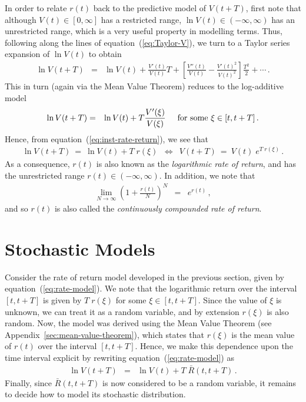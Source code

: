 \documentclass[a4paper]{book}
\begin{document}
In order to relate $r(t)$ back to the predictive model of $V(t+T)$,
first note that although $V(t)\in[0,\infty]$ has a restricted range,
$\ln V(t)\in(-\infty,\infty)$ has an unrestricted range, which is
a very useful property in modelling terms.
Thus, following along the lines of equation~(\ref{eq:Taylor-V}),
we turn to a Taylor series expansion
of $\ln V(t)$ to obtain
\begin{eqnarray}
\ln V(t+T) & = & \ln V(t)+\frac{V'(t)}{V(t)}T
+\left[\frac{V''(t)}{V(t)}
-\frac{V'(t)^2}{V(t)^2}\right]
\frac{T^2}{2}
+\cdots\,.
\label{eq:Taylor-log-V}
\end{eqnarray}
This in turn (again via the Mean Value Theorem)
reduces to the log-additive model
\begin{eqnarray}
\ln V(t+T) & = & \ln V(t)+T\frac{V'(\xi)}{V(\xi)}
\hspace*{5mm}\mbox{for some}\,\, \xi\in[t,t+T]\,.
\end{eqnarray}
Hence, from equation~(\ref{eq:inst-rate-return}), we see that
\begin{eqnarray}
\ln V(t+T)~=~\ln V(t)+T\;r(\xi) & \Leftrightarrow &
V(t+T) ~=~V(t) \;e^{T\;r(\xi)}\,.
\label{eq:rate-model}
\end{eqnarray}
As a consequence, $r(t)$ is also known as the
{\em logarithmic rate of return}, and has
the unrestricted range $r(t)\in(-\infty,\infty)$. In addition,
we note that
\begin{eqnarray}
\lim_{N\rightarrow\infty}\left(1+\frac{r(t)}{N}\right)^{N} & = &
e^{r(t)}\,,
\end{eqnarray}
and so $r(t)$ is also called the
{\em continuously compounded rate of return}.

\section{Stochastic Models}

Consider the rate of return model developed in the previous
section, given by equation~(\ref{eq:rate-model}).
We note that the logarithmic return over the interval $[t,t+T]$
is given by $T\;r(\xi)$ for some $\xi\in[t,t+T]$.
Since the value of $\xi$ is unknown, we can treat it as a random variable,
and by extension $r(\xi)$ is also random.
Now, the model was derived using the Mean Value Theorem
(see Appendix~\ref{sec:mean-value-theorem}), which states
that $r(\xi)$ is the mean value of $r(t)$ over the interval $[t,t+T]$.
Hence, we make this dependence upon the time interval explicit
by rewriting equation~(\ref{eq:rate-model}) as
\begin{eqnarray}
\ln V(t+T) & = & \ln V(t)+T\;\bar{R}(t,t+T)\,.
\label{eq:mean-rate-model}
\end{eqnarray}
Finally, since $\bar{R}(t,t+T)$ is now considered to be
a random variable, it remains to decide how to model
its stochastic distribution.
\end{document}
